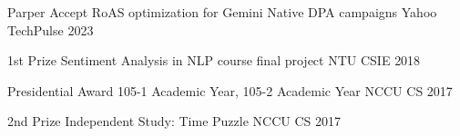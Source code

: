 
\begin{cvhonors}
	\cvhonor
	{Parper Accept} %
	{RoAS optimization for Gemini Native DPA campaigns} %
	{Yahoo TechPulse} %
	{2023} %
	

  \cvhonor
    {1st Prize} %
    {Sentiment Analysis in NLP course final project} %
    {NTU CSIE} %
    {2018} %

  \cvhonor
    {Presidential Award} %
    {105-1 Academic Year, 105-2 Academic Year} %
    {NCCU CS} %
    {2017} %

  \cvhonor
    {2nd Prize} %
    {Independent Study: Time Puzzle} %
    {NCCU CS} %
    {2017} %

\end{cvhonors}
